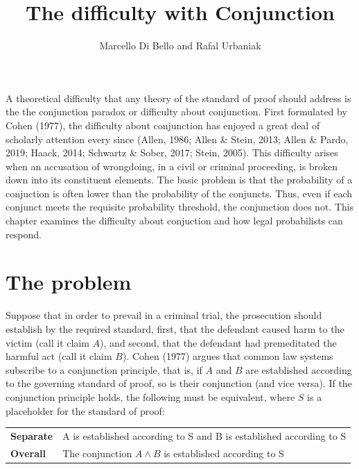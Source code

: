 \documentclass[10pt,dvipsnames,enabledeprecatedfontcommands]{scrartcl}
\title{The difficulty with Conjunction}
\author{Marcello Di Bello and Rafal Urbaniak}
\date{}
\newcommand{\et}{\wedge}
\begin{document}
\maketitle

\tableofcontents

A theoretical difficulty that any theory of the standard of proof should
address is the the conjunction paradox or difficulty about conjunction.
First formulated by Cohen (1977), the difficulty about conjunction has
enjoyed a great deal of scholarly attention every since (Allen, 1986;
Allen \& Stein, 2013; Allen \& Pardo, 2019; Haack, 2014; Schwartz \&
Sober, 2017; Stein, 2005). This difficulty arises when an accusation of
wrongdoing, in a civil or criminal proceeding, is broken down into its
constituent elements. The basic problem is that the probability of a
conjuction is often lower than the probability of the conjuncts. Thus,
even if each conjunct meets the requisite probability threshold, the
conjunction does not. This chapter examines the difficulty about
conjuction and how legal probabilists can respond.

\hypertarget{the-problem}{%
\section{The problem}\label{the-problem}}

Suppose that in order to prevail in a criminal trial, the prosecution
should establish by the required standard, first, that the defendant
caused harm to the victim (call it claim \(A\)), and second, that the
defendant had premeditated the harmful act (call it claim \(B\)). Cohen
(1977) argues that common law systems subscribe to a conjunction
principle, that is, if \(A\) and \(B\) are established according to the
governing standard of proof, so is their conjunction (and vice versa).
If the conjunction principle holds, the following must be equivalent,
where \(S\) is a placeholder for the standard of proof:

\begin{center}
\begin{tabular}
{@{}ll@{}}
\toprule
\textbf{Separate} &   A is established according to S and B is established according to S\\   
\textbf{Overall}  &   The conjunction $A \et B$ is established according to S  \\ 
\bottomrule
\end{tabular}
\end{center}
\end{document}
